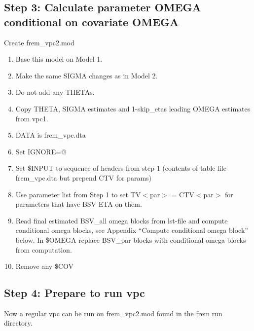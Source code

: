 \subsection{Step 3:  Calculate parameter OMEGA conditional on covariate OMEGA}
Create frem\_vpc2.mod
\begin{enumerate}
	\item Base this model on Model 1. %
    \item Make the same SIGMA changes as in Model 2. 
    \item Do not add any THETAs.
    \item Copy THETA, SIGMA estimates and 1-skip\_etas leading OMEGA estimates from vpc1.
	\item DATA is frem\_vpc.dta
	\item Set IGNORE=@ 
	\item Set \$INPUT to sequence of headers from step 1 (contents of table file frem\_vpc.dta but prepend CTV for params)
	\item Use parameter list from Step 1 to set TV$<$par$>$ = CTV$<$par$>$ for 
parameters that have BSV ETA %
on them.
	\item Read final estimated BSV\_all omega blocks from lst-file and compute conditional omega blocks, 
    see Appendix “Compute conditional omega block” below. In \$OMEGA replace BSV\_par blocks with 
    conditional omega blocks from computation.
    \item Remove any \$COV
\end{enumerate}

\subsection{Step 4: Prepare to run  vpc}
Now a regular vpc can be run on frem\_vpc2.mod found in the frem run directory.


